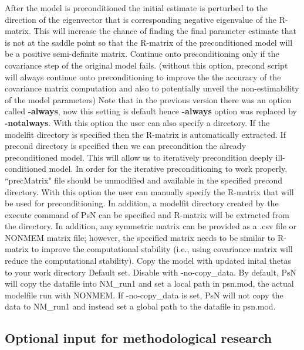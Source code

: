 \begin{optionlist}
After the model is preconditioned the initial estimate is perturbed to the direction of the eigenvector that is corresponding negative eigenvalue of the R-matrix.  This will increase the chance of finding the final parameter estimate that is not at the saddle point so that the R-matrix of the preconditioned model will be a positive semi-definite matrix.
\nextopt
{}
Continue onto preconditioning only if the covariance step of the original model fails.  (without this option, precond script will always continue onto preconditioning to improve the the accuracy of the covariance matrix computation and also to potentially unveil the non-estimability of the model parameters)  Note that in the previous version there was an option called {\bf -always}, now this setting is default hence {\bf -always} option was replaced by {\bf -notalways}.
\nextopt
{}
With this option the user can also specify a directory.  If the modelfit directory is specified then the R-matrix is automatically extracted.  If precond directory is specified then we can precondition the already preconditioned model.  This will allow us to iteratively precondition deeply ill-conditioned model.  In order for the iterative preconditioning to work properly, ``precMatrix" file should be unmodified and available in the specified precond directory.
\nextopt
{}
With this option the user can manually specify the R-matrix that will be used for preconditioning.  In addition, a modelfit directory created by the execute command of PsN can be specified and R-matrix will be extracted from the directory.  In addition, any symmetric matrix can be provided as a .csv file or NONMEM matrix file; however, the specified matrix needs to be similar to R-matrix to improve the computational stability (i.e., using covariance matrix will reduce the computational stability).
\nextopt
{}
Copy the model with updated inital thetas to your work directory	
\nextopt
{}
Default set. Disable with -no-copy\_data. By default, PsN will copy the datafile into NM\_run1 and set a local path in psn.mod, the actual modelfile run with NONMEM. If -no-copy\_data is set, PsN will not copy the data to NM\_run1 and instead set a global path to the datafile in psn.mod.
\nextopt
\end{optionlist}

\subsection{Optional input for methodological research}

